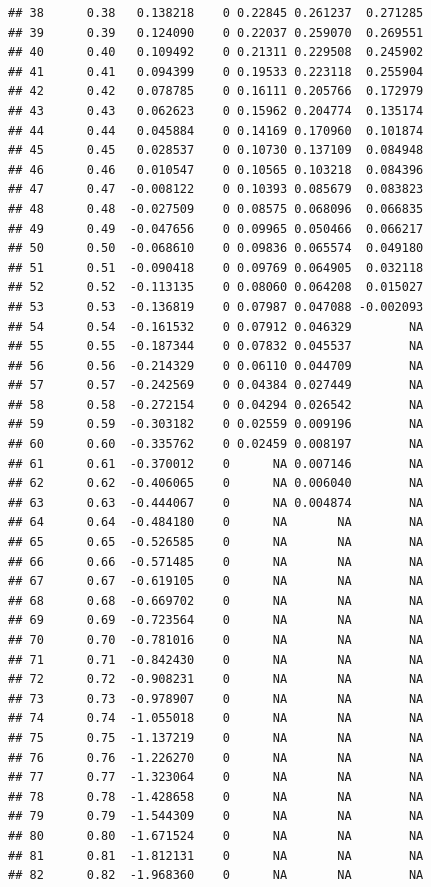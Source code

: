 \documentclass{article}\usepackage[]{graphicx}\usepackage[]{color}
\makeatletter
\newenvironment{kframe}{%
 \def\at@end@of@kframe{}%
 \ifinner\ifhmode%
  \def\at@end@of@kframe{\end{minipage}}%
  \begin{minipage}{\columnwidth}%
 \fi\fi%
 \def\FrameCommand##1{\hskip\@totalleftmargin \hskip-\fboxsep
 \colorbox{shadecolor}{##1}\hskip-\fboxsep
     \hskip-\linewidth \hskip-\@totalleftmargin \hskip\columnwidth}%
 \MakeFramed {\advance\hsize-\width
   \@totalleftmargin\z@ \linewidth\hsize
   \@setminipage}}%
 {\par\unskip\endMakeFramed%
 \at@end@of@kframe}
\newenvironment{knitrout}{}{} %
\makeatother
\begin{document}
\begin{knitrout}
\begin{kframe}
\begin{verbatim}
## 38      0.38   0.138218    0 0.22845 0.261237  0.271285
## 39      0.39   0.124090    0 0.22037 0.259070  0.269551
## 40      0.40   0.109492    0 0.21311 0.229508  0.245902
## 41      0.41   0.094399    0 0.19533 0.223118  0.255904
## 42      0.42   0.078785    0 0.16111 0.205766  0.172979
## 43      0.43   0.062623    0 0.15962 0.204774  0.135174
## 44      0.44   0.045884    0 0.14169 0.170960  0.101874
## 45      0.45   0.028537    0 0.10730 0.137109  0.084948
## 46      0.46   0.010547    0 0.10565 0.103218  0.084396
## 47      0.47  -0.008122    0 0.10393 0.085679  0.083823
## 48      0.48  -0.027509    0 0.08575 0.068096  0.066835
## 49      0.49  -0.047656    0 0.09965 0.050466  0.066217
## 50      0.50  -0.068610    0 0.09836 0.065574  0.049180
## 51      0.51  -0.090418    0 0.09769 0.064905  0.032118
## 52      0.52  -0.113135    0 0.08060 0.064208  0.015027
## 53      0.53  -0.136819    0 0.07987 0.047088 -0.002093
## 54      0.54  -0.161532    0 0.07912 0.046329        NA
## 55      0.55  -0.187344    0 0.07832 0.045537        NA
## 56      0.56  -0.214329    0 0.06110 0.044709        NA
## 57      0.57  -0.242569    0 0.04384 0.027449        NA
## 58      0.58  -0.272154    0 0.04294 0.026542        NA
## 59      0.59  -0.303182    0 0.02559 0.009196        NA
## 60      0.60  -0.335762    0 0.02459 0.008197        NA
## 61      0.61  -0.370012    0      NA 0.007146        NA
## 62      0.62  -0.406065    0      NA 0.006040        NA
## 63      0.63  -0.444067    0      NA 0.004874        NA
## 64      0.64  -0.484180    0      NA       NA        NA
## 65      0.65  -0.526585    0      NA       NA        NA
## 66      0.66  -0.571485    0      NA       NA        NA
## 67      0.67  -0.619105    0      NA       NA        NA
## 68      0.68  -0.669702    0      NA       NA        NA
## 69      0.69  -0.723564    0      NA       NA        NA
## 70      0.70  -0.781016    0      NA       NA        NA
## 71      0.71  -0.842430    0      NA       NA        NA
## 72      0.72  -0.908231    0      NA       NA        NA
## 73      0.73  -0.978907    0      NA       NA        NA
## 74      0.74  -1.055018    0      NA       NA        NA
## 75      0.75  -1.137219    0      NA       NA        NA
## 76      0.76  -1.226270    0      NA       NA        NA
## 77      0.77  -1.323064    0      NA       NA        NA
## 78      0.78  -1.428658    0      NA       NA        NA
## 79      0.79  -1.544309    0      NA       NA        NA
## 80      0.80  -1.671524    0      NA       NA        NA
## 81      0.81  -1.812131    0      NA       NA        NA
## 82      0.82  -1.968360    0      NA       NA        NA

\end{verbatim}
\end{kframe}
\end{knitrout}
\end{document}
